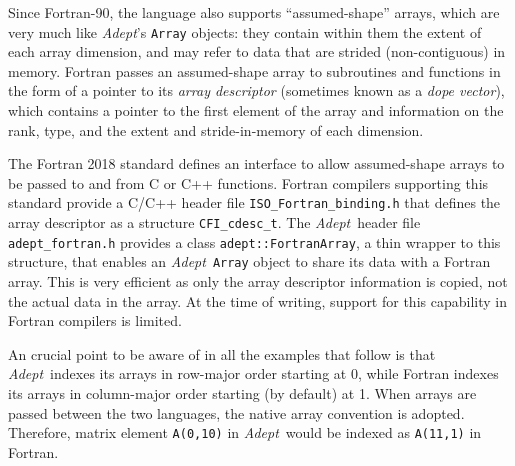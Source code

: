 \documentclass[a4,oneside]{book}
\def\codesize{\small}
\def\Adept{\emph{Adept}}
\def\code#1{{\codesize\texttt{#1}}}
\begin{document}
Since Fortran-90, the language also supports ``assumed-shape'' arrays,
which are very much like \Adept's \code{Array} objects: they contain
within them the extent of each array dimension, and may refer to data
that are strided (non-contiguous) in memory.  Fortran passes an
assumed-shape array to subroutines and functions in the form of a
pointer to its \emph{array descriptor} (sometimes known as a
\emph{dope vector}), which contains a pointer to the first element of
the array and information on the rank, type, and the extent and
stride-in-memory of each dimension.

The Fortran 2018 standard defines an interface to allow assumed-shape
arrays to be passed to and from C or C++ functions.  Fortran compilers
supporting this standard provide a C/C++ header file
\code{ISO\_Fortran\_binding.h} that defines the array descriptor as a
structure \code{CFI\_cdesc\_t}.  The \Adept\ header file
\code{adept\_fortran.h} provides a class \code{adept::FortranArray}, a
thin wrapper to this structure, that enables an \Adept\ \code{Array}
object to share its data with a Fortran array. This is very efficient
as only the array descriptor information is copied, not the actual
data in the array.  At the time of writing, support for this
capability in Fortran compilers is limited.

An crucial point to be aware of in all the examples that follow is
that \Adept\ indexes its arrays in row-major order starting at 0,
while Fortran indexes its arrays in column-major order starting (by
default) at 1. When arrays are passed between the two languages, the
native array convention is adopted. Therefore, matrix element
\code{A(0,10)} in \Adept\ would be indexed as \code{A(11,1)} in
Fortran.
\end{document}
